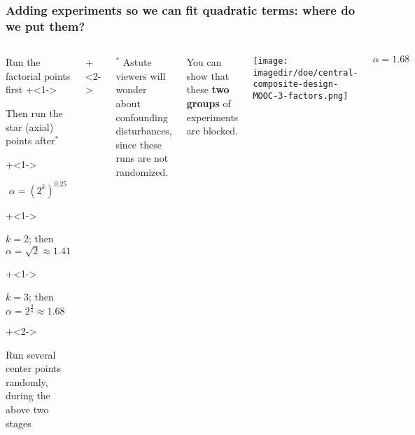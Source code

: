 \documentclass[handout,11pt,aspectratio=169,mathserif]{beamer}
\begin{document}
\begin{frame}\frametitle{Adding experiments so we can fit quadratic terms: where do we put them?}
	\begin{columns}[T]
		
			\vspace{1cm}
			
			\begin{itemize}
				\item	Run the factorial points first
				\onslide+<1->{
					\item	Then run the star (axial) points after$^\ast$
				}
				\onslide+<1->{
					\Large
					\[\alpha  = \left(2^k\right)^{0.25}\]
					
			
					\begin{itemize}
						\onslide+<1->{\item	$k = 2$; then $\alpha = \sqrt{2} \approx 1.41$ }
						\onslide+<1->{\item	$k = 3$; then $\alpha = 2^{\tfrac{3}{4}} \approx 1.68$}
					\end{itemize}
					\normalsize
				}
				\onslide+<2->{
					\item	Run several center points randomly, during the above two stages
				}
			\end{itemize}
			
			\onslide+<2->{
				\vspace{0cm}
				\tiny
				$^\ast$ Astute viewers will wonder about confounding disturbances, since these runs are not randomized.
			
				You can show that these {\color[rgb]{0,0.5,1}\textbf{two}} {\color[rgb]{0.5,0, 0.5}\textbf{groups}} of experiments are blocked.
			}
			
			
			\centerline{\texttt{[image: \\imagedir/doe/central-composite-design-MOOC-3-factors.png]}}
			
			\vspace{-0.5cm}
			\[\alpha = 1.68\]
	\end{columns}
\end{frame}
\end{document}
